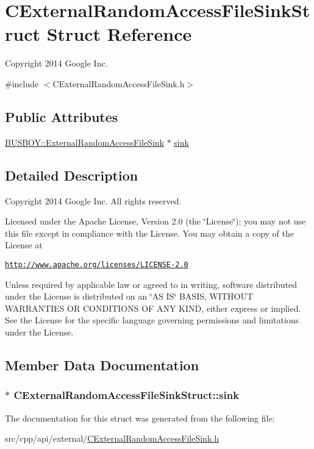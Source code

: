 \hypertarget{structCExternalRandomAccessFileSinkStruct}{
\section{CExternalRandomAccessFileSinkStruct Struct Reference}
\label{structCExternalRandomAccessFileSinkStruct}
}


Copyright 2014 Google Inc.  


{\ttfamily \#include $<$CExternalRandomAccessFileSink.h$>$}\subsection*{Public Attributes}
\begin{DoxyCompactItemize}
\item 
\hyperlink{classBUSBOY_1_1ExternalRandomAccessFileSink}{BUSBOY::ExternalRandomAccessFileSink} $\ast$ \hyperlink{structCExternalRandomAccessFileSinkStruct_a349814564fdaf4ff680a4ce00d1577c1}{sink}
\end{DoxyCompactItemize}


\subsection{Detailed Description}
Copyright 2014 Google Inc. All rights reserved.

Licensed under the Apache License, Version 2.0 (the \char`\"{}License\char`\"{}); you may not use this file except in compliance with the License. You may obtain a copy of the License at

\href{http://www.apache.org/licenses/LICENSE-2.0}{\tt http://www.apache.org/licenses/LICENSE-\/2.0}

Unless required by applicable law or agreed to in writing, software distributed under the License is distributed on an \char`\"{}AS IS\char`\"{} BASIS, WITHOUT WARRANTIES OR CONDITIONS OF ANY KIND, either express or implied. See the License for the specific language governing permissions and limitations under the License. 

\subsection{Member Data Documentation}
\hypertarget{structCExternalRandomAccessFileSinkStruct_a349814564fdaf4ff680a4ce00d1577c1}{
\subsubsection[{sink}]{$\ast$ {\bf CExternalRandomAccessFileSinkStruct::sink}}}
\label{structCExternalRandomAccessFileSinkStruct_a349814564fdaf4ff680a4ce00d1577c1}


The documentation for this struct was generated from the following file:\begin{DoxyCompactItemize}
\item 
src/cpp/api/external/\hyperlink{CExternalRandomAccessFileSink_8h}{CExternalRandomAccessFileSink.h}\end{DoxyCompactItemize}
